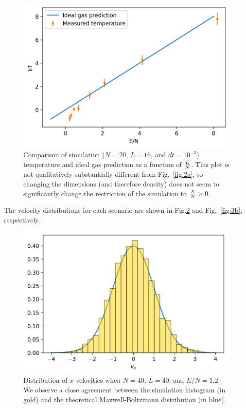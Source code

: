 \documentclass{article}
\begin{document}
\begin{figure}[H]
    \centering
    \includegraphics[width=4.75in]{homework8/p2b.png}
    \caption{Comparison of simulation ($N=20$, $L=16$, and $dt=10^{-3}$) temperature and ideal gas prediction as a function of $E\over N$. This plot is not qualitatively substantially different from Fig.~\ref{fig:2a}, so changing the dimensions (and therefore density) does not seem to significantly change the restriction of the simulation to ${E\over N}>0$.}
    \label{fig:2b}
\end{figure}

\bigskip
{}
\medskip

The velocity distributions for each scenario are shown in Fig.\ref{fig:3a} and Fig.~\ref{fig:3b}, respectively.

\begin{figure}[H]
    \centering
    \includegraphics[width=4.75in]{homework8/p3a.png}
    \caption{Distribution of $x$-velocities when $N=40$, $L=40$, and $E/N=1.2$. We observe a close agreement between the simulation histogram (in gold) and the theoretical Maxwell-Boltzmann distribution (in blue).}
    \label{fig:3a}
\end{figure}
\end{document}
